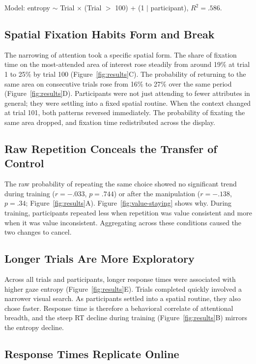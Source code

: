 \documentclass[man,natbib,floatsintext]{apa7}
\begin{document}
\noindent Model: entropy $\sim$ Trial $\times$ (Trial $>$ 100) + (1 $|$ participant), $R^2 = .586$.

\subsection{Spatial Fixation Habits Form and Break}

The narrowing of attention took a specific spatial form. The share of fixation time on the most-attended area of interest rose steadily from around 19\% at trial 1 to 25\% by trial 100 (Figure~\ref{fig:results}C). The probability of returning to the same area on consecutive trials rose from 16\% to 27\% over the same period (Figure~\ref{fig:results}D). Participants were not just attending to fewer attributes in general; they were settling into a fixed spatial routine. When the context changed at trial 101, both patterns reversed immediately. The probability of fixating the same area dropped, and fixation time redistributed across the display.

\subsection{Raw Repetition Conceals the Transfer of Control}

The raw probability of repeating the same choice showed no significant trend during training ($r=-.033$, $p=.744$) or after the manipulation ($r=-.138$, $p=.34$; Figure~\ref{fig:results}A). Figure~\ref{fig:value-staying} shows why. During training, participants repeated less when repetition was value consistent and more when it was value inconsistent. Aggregating across these conditions caused the two changes to cancel.

\subsection{Longer Trials Are More Exploratory}

Across all trials and participants, longer response times were associated with higher gaze entropy (Figure~\ref{fig:results}E). Trials completed quickly involved a narrower visual search. As participants settled into a spatial routine, they also chose faster. Response time is therefore a behavioral correlate of attentional breadth, and the steep RT decline during training (Figure~\ref{fig:results}B) mirrors the entropy decline.

\subsection{Response Times Replicate Online}
\end{document}
